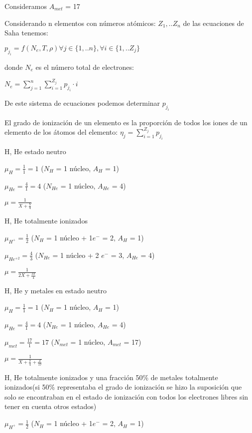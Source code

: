 \documentclass[10pt]{book}
\begin{document}
Consideramos $A_{met}$ = 17

Considerando n elementos con números atómicos: $Z_1, .. Z_n$ de las ecuaciones de Saha tenemos:

$p_{j_i} = f(N_e, T, \rho) \forall j\in \{1,..n\}, \forall i\in \{1,..Z_j\}$

donde $N_e$ es el número total de electrones: 

$N_e = \sum_{j=1}^{n} \sum_{i=1}^{Z_j} p_{j_i} \cdot i $ 

De este sistema de ecuaciones podemos determinar $p_{j_i}$

El grado de ionización de un elemento es la proporción de todos los iones de un elemento de los átomos del elemento: $\eta_j = \sum_{i=1}^{Z_j}p_{j_i}$

\begin{description}
\item H, He estado neutro

$ \mu_H  = \frac{1}{1} = 1$ ($N_H$ = 1 núcleo, $A_H$ = 1)

$ \mu_{He}  = \frac{4}{1} = 4$ ($N_{He}$ = 1 núcleo, $A_{He}$ = 4)

$ \mu = \frac{1}{X + \frac{Y}{4}}$
 
\item H, He totalmente ionizados

$ \mu_{H^+}  = \frac{1}{2} $ ($N_H$ = 1 núcleo + 1$e^-$ = 2, $A_H$ = 1)

$ \mu_{He^{+2}}  = \frac{4}{3} $ ($N_{He}$ = 1 núcleo + 2 $e^-$ = 3, $A_{He}$ = 4)

$ \mu = \frac{1}{2X + \frac{3Y}{4}}$

\item H, He y metales en estado neutro

$ \mu_H  = \frac{1}{1} = 1$ ($N_H$ = 1 núcleo, $A_H$ = 1)

$ \mu_{He}  = \frac{4}{1} = 4$ ($N_{He}$ = 1 núcleo, $A_{He}$ = 4)

$ \mu_{met}  = \frac{17}{1} = 17$ ($N_{met}$ = 1 núcleo, $A_{met}$ = 17)

$ \mu = \frac{1}{X + \frac{Y}{4} + \frac{Z}{17}}$

\item H, He totalmente ionizados y una fracción 50\% de metales  totalmente ionizados(si 50\% representaba el grado de ionización se hizo la suposición que solo se encontraban en el estado de ionización con todos los electrones libres sin tener en cuenta otros estados)

$ \mu_{H^+}  = \frac{1}{2} $ ($N_H$ = 1 núcleo + 1$e^-$ = 2, $A_H$ = 1)


\end{description}
\end{document}

